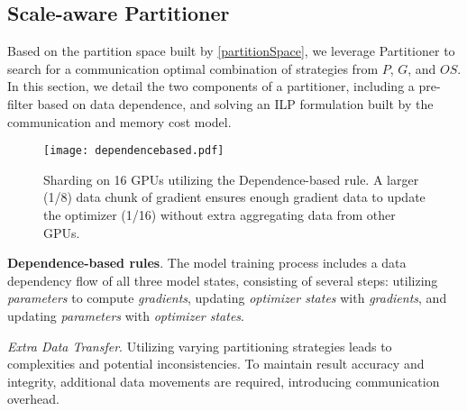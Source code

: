 

\vspace{-8pt}
\subsection{Scale-aware Partitioner}
\label{scale_aware_partition}

Based on the partition space built by \ref{partitionSpace}, we leverage Partitioner to search for a communication optimal combination of strategies from $P$, $G$, and $OS$. In this section, we detail the two components of a partitioner, including a pre-filter based on data dependence, and solving an ILP formulation built by the communication and memory cost model.

\label{partitioner}

\begin{figure}[t]
    \centering
    \texttt{[image: dependencebased.pdf]}
    \caption{Sharding on 16 GPUs utilizing the Dependence-based rule. A larger (1/8) data chunk of gradient ensures enough gradient data to update the optimizer (1/16) without extra aggregating data from other GPUs.}
    \label{fig:dependencebased}
\end{figure}

\noindent\textbf{Dependence-based rules}.
\label{dependenceBased}
The model training process includes a data dependency flow of all three model states, consisting of several steps: utilizing \textit{parameters} to compute \textit{gradients}, updating \textit{optimizer states} with \textit{gradients}, and updating \textit{parameters} with \textit{optimizer states}. 


\emph{Extra Data Transfer}.  
Utilizing varying partitioning strategies leads to complexities and potential inconsistencies. To maintain result accuracy and integrity, additional data movements are required, introducing communication overhead. 



